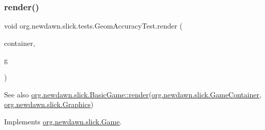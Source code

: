 \mbox{\label{classorg_1_1newdawn_1_1slick_1_1tests_1_1_geom_accuracy_test_a0bc7ca3b337fdf2bc833164e7c19d242}} 
\subsubsection{\texorpdfstring{render()}{render()}}
{\footnotesize\ttfamily void org.\+newdawn.\+slick.\+tests.\+Geom\+Accuracy\+Test.\+render (\begin{DoxyParamCaption}\item[{\mbox{\hyperlink{classorg_1_1newdawn_1_1slick_1_1_game_container}{Game\+Container}}}]{container,  }\item[{\mbox{\hyperlink{classorg_1_1newdawn_1_1slick_1_1_graphics}{Graphics}}}]{g }\end{DoxyParamCaption})\hspace{0.3cm}{\ttfamily [inline]}}

\begin{DoxySeeAlso}{See also}
\mbox{\hyperlink{interfaceorg_1_1newdawn_1_1slick_1_1_game_af1a4670d43eb3ba04dfcf55ab1975b64}{org.\+newdawn.\+slick.\+Basic\+Game\+::render}}(\mbox{\hyperlink{classorg_1_1newdawn_1_1slick_1_1_game_container}{org.\+newdawn.\+slick.\+Game\+Container}}, \mbox{\hyperlink{classorg_1_1newdawn_1_1slick_1_1_graphics}{org.\+newdawn.\+slick.\+Graphics}}) 
\end{DoxySeeAlso}


Implements \mbox{\hyperlink{interfaceorg_1_1newdawn_1_1slick_1_1_game_af1a4670d43eb3ba04dfcf55ab1975b64}{org.\+newdawn.\+slick.\+Game}}.


